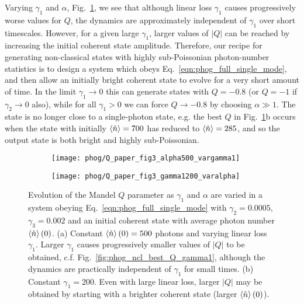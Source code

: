 Varying $\gamma_1$ and $\alpha$, Fig.~\ref{fig:phog_fig3paper2}, we see that although linear loss $\gamma_1$ causes progressively worse values for $Q$, the dynamics are approximately independent of $\gamma_1$ over short timescales. However, for a given large $\gamma_1$, larger values of $\left|Q\right|$ can be reached by increasing the initial coherent state amplitude. Therefore, our recipe for generating non-classical states with highly sub-Poissonian photon-number statistics is to design a system which obeys Eq.~\ref{eqn:phog_full_single_mode}, and then allow an initially bright coherent state to evolve for a very short amount of time. In the limit $\gamma_1 \rightarrow 0$ this can generate states with $Q = -0.8$ (or $Q=-1$ if $\gamma_2 \rightarrow 0$ also), while for all $\gamma_1 > 0$ we can force $Q \rightarrow -0.8$ by choosing $\alpha \gg 1$. The state is no longer close to a single-photon state, e.g. the best $Q$ in Fig.~\ref{fig:phog_fig3paper2}b occurs when the state with initially $\ev{\hat{n}}=700$ has reduced to $\ev{\hat{n}} = 285$, and so the output state is both bright and highly sub-Poissonian. %

\begin{figure}[htp]
\centering
	\begin{subfigure}{0.49\linewidth}
	\centering
	\caption{}
	\texttt{[image: phog/Q\_paper\_fig3\_alpha500\_vargamma1]}
	\end{subfigure}
	\begin{subfigure}{0.49\linewidth}
	\centering
	\caption{}
	\texttt{[image: phog/Q\_paper\_fig3\_gamma1200\_varalpha]}
	\end{subfigure}
\caption{\label{fig:phog_fig3paper2} Evolution of the Mandel $Q$ parameter as $\gamma_1$ and $\alpha$ are varied in a system obeying Eq.~\ref{eqn:phog_full_single_mode} with $\gamma_2 = 0.0005$, $\gamma_3 = 0.002$ and an initial coherent state with average photon number $\ev{\hat{n}}\left(0\right)$. (a) Constant $\ev{\hat{n}}\left(0\right) = 500$ photons and varying linear loss $\gamma_1$. Larger $\gamma_1$ causes progressively smaller values of $\left|Q\right|$ to be obtained, c.f. Fig.~\ref{fig:phog_ncl_best_Q_gamma1}, although the dynamics are practically independent of $\gamma_1$ for small times. (b) Constant $\gamma_1 = 200$. Even with large linear loss, larger $\left|Q\right|$ may be obtained by starting with a brighter coherent state (larger $\ev{\hat{n}}\left(0\right)$).}
\end{figure}



